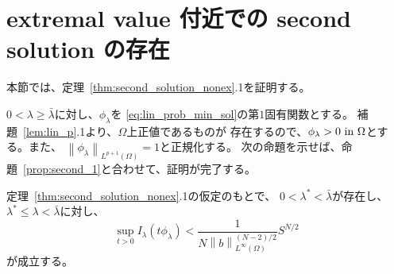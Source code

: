 \section{extremal value 付近での second solution の存在} \label{sec:exist}

本節では、定理~\ref{thm:second_solution_nonex}.1を証明する。

$0 < \lambda \geq \bar{\lambda}$に対し、$\phi_\lambda$を
\eqref{eq:lin_prob_min_sol}の第$1$固有関数とする。
補題~\ref{lem:lin_p}.1より、$\Omega$上正値であるものが
存在するので、$\phi_\lambda > 0 ~\text{in}~ \Omega$とする。また、
$\left\| \phi_\lambda \right\|_{L^{p+1}(\Omega)} = 1$と正規化する。
次の命題を示せば、命題~\ref{prop:second_1}と合わせて、証明が完了する。

\begin{prop} \label{prop:exist}
 定理~\ref{thm:second_solution_nonex}.1の仮定のもとで、
 $0 < \lambda^* < \bar{\lambda}$が存在し、
 $\lambda^* \leq \lambda < \bar{\lambda}$に対し、
 \begin{equation}
  \sup_{t > 0} I_\lambda(t \phi_\lambda) < \frac{1}{N \left\| b
             \right\|_{L^\infty(\Omega)}^{(N-2)/2}}
   S^{N/2} \label{eq:exist_S}
 \end{equation}
 が成立する。
\end{prop}

